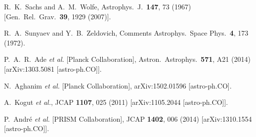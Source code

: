 \documentclass[aps,twocolumn,floats,prd,nofootinbib,10pt,floatfix]{revtex4-1}
\begin{document}
\begin{thebibliography}{99}

  R.~K.~Sachs and A.~M.~Wolfe,
  Astrophys.\ J.\  {\bf 147}, 73 (1967)
  [Gen.\ Rel.\ Grav.\  {\bf 39}, 1929 (2007)].


  R.~A.~Sunyaev and Y.~B.~Zeldovich,
  Comments Astrophys.\ Space Phys.\  {\bf 4}, 173 (1972).


  P.~A.~R.~Ade {\it et al.} [Planck Collaboration],
  Astron.\ Astrophys.\  {\bf 571}, A21 (2014)
  [arXiv:1303.5081 [astro-ph.CO]].


  N.~Aghanim {\it et al.} [Planck Collaboration],
  arXiv:1502.01596 [astro-ph.CO].


  A.~Kogut {\it et al.},
  JCAP {\bf 1107}, 025 (2011)
  [arXiv:1105.2044 [astro-ph.CO]].


  P.~Andr\'e {\it et al.} [PRISM Collaboration],
  JCAP {\bf 1402}, 006 (2014)
  [arXiv:1310.1554 [astro-ph.CO]].



\end{thebibliography}
\end{document}

